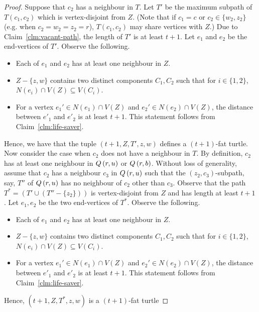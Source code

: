 \documentclass[a4paper]{article}
\begin{document}
\begin{proof}
Suppose that $c_2$ has a neighbour in $T$. Let $T'$ be the maximum subpath of $T(c_1,c_2)$ which is vertex-disjoint
from $Z$. ({Note that if $c_1=c$ or $c_2\in \{w_2,z_2\}$ (e.g. when $c_2=w_2=z_2=r$), $T(c_1,c_2)$ may share vertices with $Z$}.) Due to Claim~\ref{clm:vacant-path}, the length of $T'$ is at least $t+1$. Let $e_1$ and $e_2$ be the end-vertices of $T'$. Observe the following.

\begin{itemize}
    \item Each of $e_1$ and $e_2$ has at least one neighbour in $Z$.
    
    \item $Z-\{z,w\}$ contains two distinct components $C_1,C_2$ such that for $i\in \{1,2\}$, $N(e_i)\cap V(Z) \subseteq V(C_i)$.
    
    \item For a vertex $e_1'\in N(e_1)\cap V(Z)$ and $e_2'\in N(e_2)\cap V(Z)$, the distance between $e'_1$ and $e'_2$ is at least $t+1$. This statement follows from Claim~\ref{clm:life-saver}.
\end{itemize}

Hence, we have that the tuple $(t+1,Z,T',z,w)$ defines a $(t+1)$-fat turtle. Now consider the case when $c_2$ does not have a neighbour in $T$. By definition, $c_2$ has at least one neighbour in $Q\left({r},{u}\right)$ or $Q\left({r},{b}\right)$. Without loss of generality, assume that $c_2$ has a neighbour $c_3$ in $Q\left({r},{u}\right)$ such that the $(z_2,c_3)$-subpath, say, $T''$ of $Q\left({r},{u}\right)$ has no neighbour of $c_2$ {other than $c_3$}. Observe that the path $T^*= (T' \cup (T''-\{z_2\}))$ is vertex-disjoint from $Z$ and has length at least $t+1$. Let $e_1,e_2$ be the two end-vertices of $T^*$. Observe the following.
\begin{itemize}
    \item Each of $e_1$ and $e_2$ has at least one neighbour in $Z$.
    
    \item $Z-\{z,w\}$ contains two distinct components $C_1,C_2$ such that for $i\in \{1,2\}$, $N(e_i)\cap V(Z) \subseteq V(C_i)$.
    
    \item For a vertex $e_1'\in N(e_1)\cap V(Z)$ and $e_2'\in N(e_2)\cap V(Z)$, the distance between $e'_1$ and $e'_2$ is at least $t+1$. This statement follows from Claim~\ref{clm:life-saver}.
\end{itemize}

 Hence, $(t+1,Z,T^*,z,w)$ is a $(t+1)$-fat turtle
\end{proof}
\end{document}
